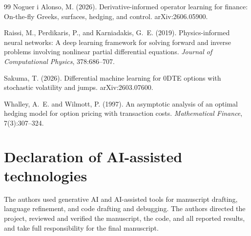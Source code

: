 \documentclass[10pt]{article}
\begin{document}
\begin{thebibliography}{99}
Noguer i Alonso, M. (2026).
\newblock Derivative-informed operator learning for finance: On-the-fly Greeks,
surfaces, hedging, and control.
\newblock arXiv:2606.05900.

Raissi, M., Perdikaris, P., and Karniadakis, G.~E. (2019).
\newblock Physics-informed neural networks: A deep learning framework for solving
forward and inverse problems involving nonlinear partial differential equations.
\newblock \emph{Journal of Computational Physics}, 378:686--707.

Sakuma, T. (2026).
\newblock Differential machine learning for 0DTE options with stochastic
volatility and jumps.
\newblock arXiv:2603.07600.

Whalley, A.~E. and Wilmott, P. (1997).
\newblock An asymptotic analysis of an optimal hedging model for option pricing
with transaction costs.
\newblock \emph{Mathematical Finance}, 7(3):307--324.

\end{thebibliography}


\section*{Declaration of AI-assisted technologies}
The authors used generative AI and AI-assisted tools for manuscript drafting,
language refinement, and code drafting and debugging. The authors directed the
project, reviewed and verified the manuscript, the code, and all reported results,
and take full responsibility for the final manuscript.
\end{document}

